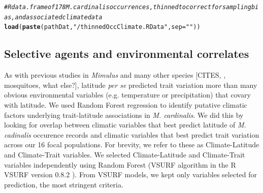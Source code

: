 \documentclass[11pt, oneside]{article}\usepackage[]{graphicx}\usepackage[]{color}
\makeatletter
\newcommand{\hlstr}[1]{\textcolor[rgb]{0.192,0.494,0.8}{#1}}%
\newcommand{\hlcom}[1]{\textcolor[rgb]{0.678,0.584,0.686}{\textit{#1}}}%
\newcommand{\hlstd}[1]{\textcolor[rgb]{0.345,0.345,0.345}{#1}}%
\newcommand{\hlkwc}[1]{\textcolor[rgb]{0.333,0.667,0.333}{#1}}%
\newcommand{\hlkwd}[1]{\textcolor[rgb]{0.737,0.353,0.396}{\textbf{#1}}}%
\newenvironment{kframe}{%
 \def\at@end@of@kframe{}%
 \ifinner\ifhmode%
  \def\at@end@of@kframe{\end{minipage}}%
  \begin{minipage}{\columnwidth}%
 \fi\fi%
 \def\FrameCommand##1{\hskip\@totalleftmargin \hskip-\fboxsep
 \colorbox{shadecolor}{##1}\hskip-\fboxsep
     \hskip-\linewidth \hskip-\@totalleftmargin \hskip\columnwidth}%
 \MakeFramed {\advance\hsize-\width
   \@totalleftmargin\z@ \linewidth\hsize
   \@setminipage}}%
 {\par\unskip\endMakeFramed%
 \at@end@of@kframe}
\newenvironment{knitrout}{}{} %
\newcommand{\pkg}[1]{{\fontseries{b}\selectfont #1}}
\makeatother
\begin{document}
\begin{knitrout}
\color{fgcolor}\begin{kframe}
\begin{alltt}
\hlcom{# R data.frame of 178 M. cardinalis occurrences, thinned to correct for sampling bias, and associated climate data}
\hlkwd{load}\hlstd{(}\hlkwd{paste}\hlstd{(pathDat,} \hlstr{"/thinnedOccClimate.RData"}\hlstd{,} \hlkwc{sep} \hlstd{=} \hlstr{""}\hlstd{))}
\end{alltt}
\end{kframe}
\end{knitrout}

\subsection*{Selective agents and environmental correlates}

As with previous studies in \textit{Mimulus} and many other species [CITES, \citep{Huey_etal}, mosquitoes, what else?], latitude \textit{per se} predicted trait variation more than many obvious environmental variables (e.g. temperature or precipitation) that covary with latitude. We used Random Forest regression \citep{Liaw_Wiener_2002} to identify putative climatic factors underlying trait-latitude associations in \textit{M. cardinalis}. We did this by looking for overlap between climatic variables that best predict latitude of \textit{M. cadinalis} occurence records and climatic variables that best predict trait variation across our 16 focal populations. For brevity, we refer to these as Climate-Latitude and Climate-Trait variables. We selected Climate-Latitude and Climate-Trait variables independently using Random Forest (VSURF algorithm in the R \pkg{VSURF} version 0.8.2 \citep{Genuer_etal_2014}). From VSURF models, we kept only variables selected for prediction, the most stringent criteria.
\end{document}
